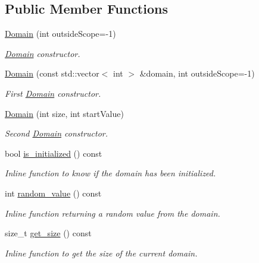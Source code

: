 \subsection*{Public Member Functions}
\begin{DoxyCompactItemize}
\item 
\hyperlink{classghost_1_1Domain_a48bfae90d7dbb6d8e1a3afdd8e471e4f}{Domain} (int outside\-Scope=-\/1)
\begin{DoxyCompactList}\small\item\em \hyperlink{classghost_1_1Domain}{Domain} constructor. \end{DoxyCompactList}\item 
\hyperlink{classghost_1_1Domain_ab531002617c586474bb5571dedc28ecc}{Domain} (const std\-::vector$<$ int $>$ \&domain, int outside\-Scope=-\/1)
\begin{DoxyCompactList}\small\item\em First \hyperlink{classghost_1_1Domain}{Domain} constructor. \end{DoxyCompactList}\item 
\hyperlink{classghost_1_1Domain_a6a9f7b0aec78acb0b0f4edefaea7a6e9}{Domain} (int size, int start\-Value)
\begin{DoxyCompactList}\small\item\em Second \hyperlink{classghost_1_1Domain}{Domain} constructor. \end{DoxyCompactList}\item 
bool \hyperlink{classghost_1_1Domain_a3190b9f6968e00831434f8d241991353}{is\-\_\-initialized} () const 
\begin{DoxyCompactList}\small\item\em Inline function to know if the domain has been initialized. \end{DoxyCompactList}\item 
int \hyperlink{classghost_1_1Domain_a5d12f840be7a0ddd673c85d70426a75e}{random\-\_\-value} () const 
\begin{DoxyCompactList}\small\item\em Inline function returning a random value from the domain. \end{DoxyCompactList}\item 
size\-\_\-t \hyperlink{classghost_1_1Domain_a222990a926a5313aef33025d48b41712}{get\-\_\-size} () const 
\begin{DoxyCompactList}\small\item\em Inline function to get the size of the current domain. \end{DoxyCompactList}\item 

\end{DoxyCompactItemize}
